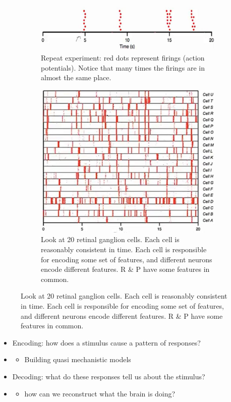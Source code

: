 \documentclass[]{article}
\begin{document}
\begin{figure}[H]
\begin{center}
\begin{subfigure}[to]{0.45\textwidth}
		\end{subfigure}
		\begin{subfigure}[to]{0.45\textwidth}
			\caption{Repeat experiment: red dots represent firings (action potentials). Notice that many times the firings are in almost the same place.}
			\includegraphics[width=\textwidth]{movie-firings}
		\end{subfigure}
		\begin{subfigure}[to]{0.45\textwidth}
			\caption{Look at 20 retinal ganglion cells. Each cell is reasonably consistent in time. Each cell is responsible for encoding some set of features, and different neurons encode different features. R \& P have some features in common.}\label{fig:movie-firings-20}
			\includegraphics[width=\textwidth]{movie-firings-20}
		\end{subfigure}
	\end{center}
\end{figure}

\begin{itemize}
	\item Encoding: how does a stimulus cause a pattern of responses?
	\item\begin{itemize}
		\item  Building quasi mechanistic models
	\end{itemize}
	\item Decoding: what do these responses tell us about the stimulus?
	\item \begin{itemize}
		\item how can we reconstruct what the brain is doing?
	\end{itemize}
\end{itemize}
\end{document}
